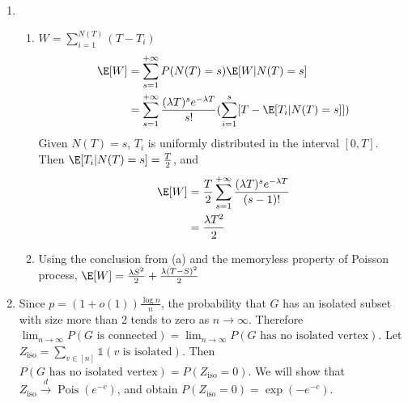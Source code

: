 \documentclass{article}
\DeclareMathOperator{\Pois}{Pois}
\def\iso{\mathrm{iso}}
\begin{document}
\begin{enumerate}
\item \begin{enumerate}
    \item $W=\sum_{i=1}^{N(T)} (T-T_i)$
\begin{align*}
    \E[W] &= \sum_{s=1}^{+\infty} P(N(T)=s)\E[W|N(T)=s] \\
    &= \sum_{s=1}^{+\infty}
    \frac{(\lambda T)^s e^{-\lambda T}}{s!}(\sum_{i=1}^s [T-\E[T_i | N(T)=s]])
\end{align*}
Given $N(T)=s$, $T_i$ is uniformly distributed in
the interval $[0,T]$. Then $\E[T_i | N(T)=s]=\frac{T}{2}$, and
\begin{align*}
    \E[W]    &= \frac{T}{2}\sum_{s=1}^{+\infty}
    \frac{(\lambda T)^s e^{-\lambda T}}{(s-1)!}\\
    &=\frac{\lambda T^2}{2}
\end{align*}
\item Using the conclusion from (a) and the memoryless
property of Poisson process, $\E[W]=\frac{\lambda S^2}{2} + \frac{\lambda (T-S)^2}{2}$
\end{enumerate}
\item Since $p=(1+o(1))\frac{\log n}{n}$, the probability that $G$ has an isolated subset
with size more than 2 tends to zero as $n\to \infty$.
Therefore $\lim_{n\to\infty}
P(G \textrm{ is connected})
=\lim_{n\to\infty}
P(G \textrm{ has no isolated vertex})$.
Let $Z_{\iso}=\sum_{v\in[n]} \mathds{1} (v \textrm{ is isolated})$. Then 
$P(G \textrm{ has no isolated vertex})
=P(Z_{\iso}=0)
$. We will show that $Z_{\iso} \stackrel{d}{\to} \Pois(e^{-c})$, and obtain $P(Z_{\iso}=0)=\exp(-e^{-c})$.


\end{enumerate}
\end{document}

